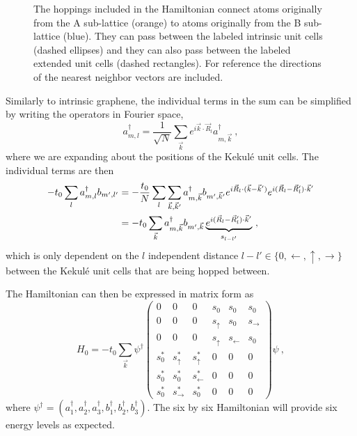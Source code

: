 \begin{figure}
	\begin{center}
	
	\end{center}
	\caption[Diagram of the hoppings in the expanded Kekul\'e unit cell]{\label{fig:kek:hoppings}
		The hoppings included in the Hamiltonian connect atoms originally from the A sub-lattice (orange) to atoms originally from the B sub-lattice (blue).
		They can pass between the labeled intrinsic unit cells (dashed ellipses) and they can also pass between the labeled extended unit cells (dashed rectangles).
		For reference the directions of the nearest neighbor vectors are included.
	}
\end{figure}

Similarly to intrinsic graphene, the individual terms in the sum can be simplified by writing the operators in Fourier space,
\begin{equation}
	a_{m,l}^{\dagger}=\frac{1}{\sqrt{N}}\sum_{\vec{k}} e^{ i \vec{k}  \cdot \vec{R}_l} a_{m,\vec{k} }^{\dagger} \ ,
	\label{eq:kek:FT}
\end{equation}
where we are expanding about the positions of the Kekul\'e unit cells.
The individual terms are then
\begin{align*}
	-t_0 \sum_l a^{\dagger}_{m,l} b_{m',l'} &=
	    -\frac{t_0}{N}\sum_l \sum_{\vec{k},\vec{k}'} a^{\dagger}_{m,\vec{k}} b_{m',\vec{k}'} 
	    e^{i \vec{R}_l \cdot (\vec{k}-\vec{k}')} e^{i(\vec{R}_l-\vec{R}_l')\cdot \vec{k}'} \\
	    &= -t_0 \sum_{\vec{k}} a^{\dagger}_{m,\vec{k}} b_{m',\vec{k}} \underbrace{e^{i(\vec{R}_l-\vec{R}_l')\cdot \vec{k}'}}_{s_{l-l'}} \ ,
\end{align*}
which is only dependent on the $l$ independent distance $l-l' \in \{ 0,\leftarrow,\uparrow,\rightarrow \}$ between the Kekul\'e unit cells that are being hopped between.

The Hamiltonian can then be expressed in matrix form as
\begin{equation}
	H_0=-t_0 \sum_{\vec{k}} \psi^{\dagger} 
	\left(\begin{array}{cccccc}
		0     & 0                 & 0                & s_0          & s_0            & s_0 \\
		0     & 0                 & 0                & s_{\uparrow} & s_0            & s_{\rightarrow} \\
		0     & 0                 & 0                & s_{\uparrow} & s_{\leftarrow} & s_0 \\
		s_0^* & s_{\uparrow}^*    & s_{\uparrow}^*   & 0            & 0              & 0 \\
		s_0^* & s_0^*             & s_{\leftarrow}^* & 0            & 0              & 0 \\
		s_0^* & s_{\rightarrow}^* & s_0^*            & 0            & 0              & 0 
	\end{array}\right)
	\psi \ ,
	\label{eq:kek:Hzonefold}
\end{equation}
where $\psi^{\dagger}=\left( a^{\dagger}_1, a^{\dagger}_2, a^{\dagger}_3, b^{\dagger}_1, b^{\dagger}_2, b^{\dagger}_3 \right)$.
The six by six Hamiltonian will provide six energy levels as expected.

